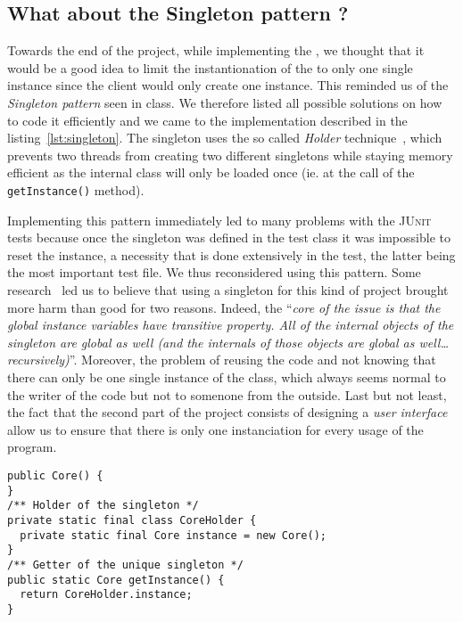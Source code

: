 
\subsection{What about the Singleton pattern ?} %
\label{sub:what_about_the_singleton_pattern}
Towards the end of the project, while implementing the \Core,
we thought that it would be a good idea to limit
the instantionation of the \Core to only one single instance
since the client would only create one instance.
This reminded us of the \emph{Singleton pattern} seen in class.
We therefore listed all possible solutions on how to code
it efficiently and we came to the implementation described
in the listing~\ref{lst:singleton}.
The singleton uses the so called \emph{Holder} technique~\cite{goodSingleton},
which prevents two threads from creating two different singletons
while staying memory efficient as the internal class will only be
loaded once (ie. at the call of the \lstinline|getInstance()| method).

Implementing this pattern immediately led to many problems with
the \textsc{JUnit} tests because once the singleton was defined in the test class it
was impossible to reset the instance, a necessity that is done extensively
in the \Core test, the latter being the most important test file.
We thus reconsidered using this pattern.
Some research~\cite{singletonLiars} led us to believe that using a singleton for this kind
of project brought more harm than good for two reasons.
Indeed, the ``\textit{core of the issue is that the global instance 
variables have transitive property. All of the internal objects of the 
singleton are global as well (and the internals of those objects are 
global as well\dots recursively)}''\cite{codeHardToTest}.
Moreover, the problem of reusing the code and not knowing that
there can only be one single instance of the \Core class,
which always seems normal to the writer of the code but not
to somenone from the outside.
Last but not least, the fact that the second part of the project consists of
designing a \emph{user interface} allow us to ensure that there is only one instanciation
for every usage of the program.

\begin{lstlisting}[caption=How the implementation of the Singleton pattern
  would look like.,
  label=lst:singleton] 
public Core() {
}
/** Holder of the singleton */
private static final class CoreHolder {		
  private static final Core instance = new Core();
}
/** Getter of the unique singleton */
public static Core getInstance() {
  return CoreHolder.instance;
}
\end{lstlisting}
  

